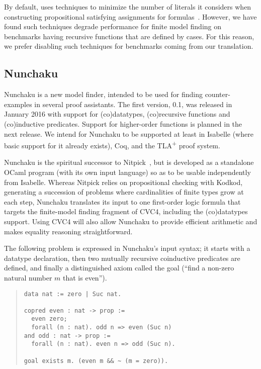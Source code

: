 By default, 
\cvc uses techniques to minimize the number of literals it considers when constructing propositional satisfying assignments for formulas~\cite{relevancy2007}.
However, we have found such techniques degrade performance for finite model finding on
benchmarks having recursive functions that are defined by cases.
For this reason, we prefer disabling such techniques for benchmarks coming from our translation.



\subsection{Nunchaku}
\label{ssec:nunchaku}

Nunchaku is a new model finder, intended
to be used for finding counter-examples in several proof assistants. The
first version, 0.1, was released in January 2016 with support for (co)datatypes,
(co)recursive functions and (co)inductive predicates.
Support for higher-order
functions is planned in the next release.
We intend for Nunchaku to be supported at least in Isabelle (where basic
support for it already exists), Coq, and the TLA\textsuperscript{+} proof
system.

Nunchaku is the spiritual successor to Nitpick~\cite{blanchette-nipkow-2010},
but is developed as a standalone OCaml program (with its own input language) so
as to be usable independently from Isabelle.
Whereas Nitpick relies on propositional checking with Kodkod,
generating a succession of problems where cardinalities of finite types
grow at each step, Nunchaku
translates its input to one first-order logic formula that targets
the finite-model finding fragment of CVC4, including the (co)datatypes support.
Using CVC4 will also allow Nunchaku to provide efficient arithmetic and makes
equality reasoning straightforward.

The following problem is expressed in Nunchaku's input syntax; it starts with
a datatype declaration, then two mutually recursive coinductive predicates
are defined, and finally a distinguished axiom called the goal
(``find a non-zero natural number $m$ that is even'').
\begin{quote}
\begin{verbatim}
data nat := zero | Suc nat.

copred even : nat -> prop :=
  even zero;
  forall (n : nat). odd n => even (Suc n)
and odd : nat -> prop :=
  forall (n : nat). even n => odd (Suc n).

goal exists m. (even m && ~ (m = zero)).
\end{verbatim}
\end{quote}

